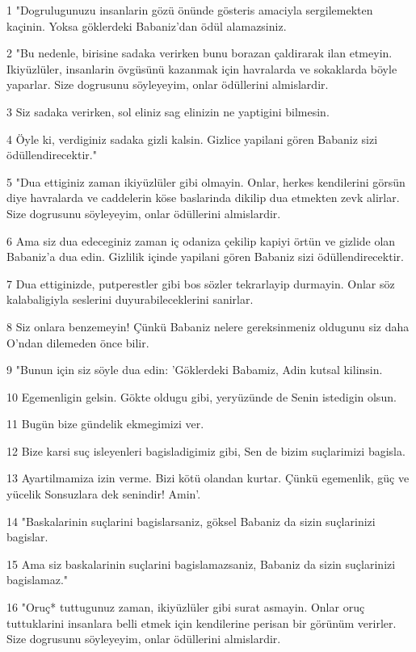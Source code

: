 \par 1 "Dogrulugunuzu insanlarin gözü önünde gösteris amaciyla sergilemekten kaçinin. Yoksa göklerdeki Babaniz'dan ödül alamazsiniz.
\par 2 "Bu nedenle, birisine sadaka verirken bunu borazan çaldirarak ilan etmeyin. Ikiyüzlüler, insanlarin övgüsünü kazanmak için havralarda ve sokaklarda böyle yaparlar. Size dogrusunu söyleyeyim, onlar ödüllerini almislardir.
\par 3 Siz sadaka verirken, sol eliniz sag elinizin ne yaptigini bilmesin.
\par 4 Öyle ki, verdiginiz sadaka gizli kalsin. Gizlice yapilani gören Babaniz sizi ödüllendirecektir."
\par 5 "Dua ettiginiz zaman ikiyüzlüler gibi olmayin. Onlar, herkes kendilerini görsün diye havralarda ve caddelerin köse baslarinda dikilip dua etmekten zevk alirlar. Size dogrusunu söyleyeyim, onlar ödüllerini almislardir.
\par 6 Ama siz dua edeceginiz zaman iç odaniza çekilip kapiyi örtün ve gizlide olan Babaniz'a dua edin. Gizlilik içinde yapilani gören Babaniz sizi ödüllendirecektir.
\par 7 Dua ettiginizde, putperestler gibi bos sözler tekrarlayip durmayin. Onlar söz kalabaligiyla seslerini duyurabileceklerini sanirlar.
\par 8 Siz onlara benzemeyin! Çünkü Babaniz nelere gereksinmeniz oldugunu siz daha O'ndan dilemeden önce bilir.
\par 9 "Bunun için siz söyle dua edin: 'Göklerdeki Babamiz, Adin kutsal kilinsin.
\par 10 Egemenligin gelsin. Gökte oldugu gibi, yeryüzünde de Senin istedigin olsun.
\par 11 Bugün bize gündelik ekmegimizi ver.
\par 12 Bize karsi suç isleyenleri bagisladigimiz gibi, Sen de bizim suçlarimizi bagisla.
\par 13 Ayartilmamiza izin verme. Bizi kötü olandan kurtar. Çünkü egemenlik, güç ve yücelik Sonsuzlara dek senindir! Amin'.
\par 14 "Baskalarinin suçlarini bagislarsaniz, göksel Babaniz da sizin suçlarinizi bagislar.
\par 15 Ama siz baskalarinin suçlarini bagislamazsaniz, Babaniz da sizin suçlarinizi bagislamaz."
\par 16 "Oruç* tuttugunuz zaman, ikiyüzlüler gibi surat asmayin. Onlar oruç tuttuklarini insanlara belli etmek için kendilerine perisan bir görünüm verirler. Size dogrusunu söyleyeyim, onlar ödüllerini almislardir.
